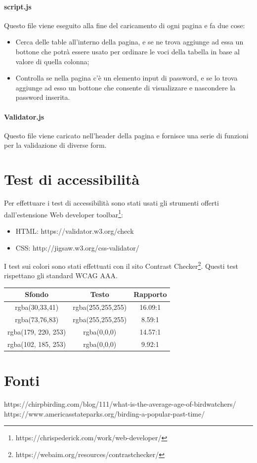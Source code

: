 \documentclass[12pt, a4paper]{article}
\begin{document}
    \paragraph{script.js} Questo file viene eseguito alla fine del caricamento di ogni pagina e fa due cose:
    \begin{itemize}
        \item Cerca delle table all'interno della pagina, e se ne trova aggiunge ad essa un bottone che potrà essere usato per ordinare le voci della tabella in base al valore di quella colonna;
        \item Controlla se nella pagina c'è un elemento input di password, e se lo trova aggiunge ad esso un bottone che consente di visualizzare e nascondere la password inserita.
    \end{itemize}

    \paragraph{Validator.js} Questo file viene caricato nell'header della pagina e fornisce una serie di funzioni per la validazione di diverse form.


    \section{Test di accessibilità}
    Per effettuare i test di accessibilità sono stati usati gli strumenti offerti dall'estensione Web developer toolbar\footnote{https://chrispederick.com/work/web-developer/}:
    \begin{itemize}
        \item HTML: https://validator.w3.org/check
        \item CSS: http://jigsaw.w3.org/css-validator/
    \end{itemize}

    I test sui colori sono stati effettuati con il sito Contrast Checker\footnote{https://webaim.org/resources/contrastchecker/}. Questi test rispettano gli standard WCAG AAA.
    \begin{center}
    \begin{tabular}{c|c|c}
    Sfondo & Testo & Rapporto \\
    \hline
    rgba(30,33,41) & rgba(255,255,255) & 16.09:1 \\
    rgba(73,76,83) & rgba(255,255,255) & 8.59:1 \\
    rgba(179, 220, 253) & rgba(0,0,0) & 14.57:1 \\
    rgba(102, 185, 253) & rgba(0,0,0) & 9.92:1 
    \end{tabular}
\end{center}
    \section{Fonti}
    https://chirpbirding.com/blog/111/what-is-the-average-age-of-birdwatchers/
    https://www.americasstateparks.org/birding-a-popular-past-time/
\end{document}

